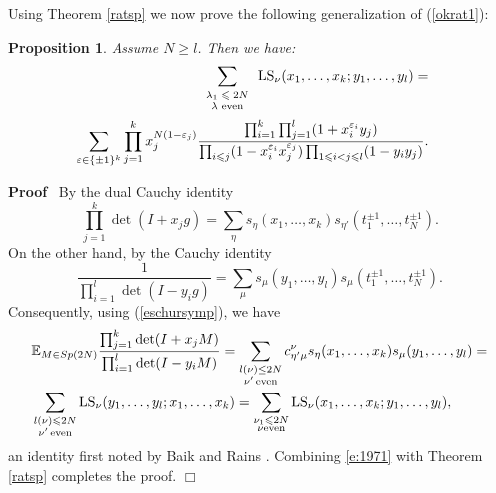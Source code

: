 \documentclass[11pt]{amsart}
\newcommand{\tmop}[1]{\ensuremath{\operatorname{#1}}}
\newtheorem{proposition}{Proposition}
\renewenvironment{proof}{
\noindent\textbf{Proof}\ }{\hspace*{\fill}
\begin{math}\Box\end{math}\medskip}
\newcommand{\tmscript}[1]{\text{\scriptsize $#1$}}
\newcommand{\HS}{{\hbox{\rm LS}}}
\begin{document}
Using Theorem \ref{ratsp} we now prove the following
generalization of (\ref{okrat1}):

\begin{proposition} Assume $N \geqslant l$. Then we
  have:
  \label{prop:ok1}
  \begin{eqnarray*}
    \sum_{\tmscript{\begin{array}{c}
      \lambda_1 \leqslant 2 N\\
      \text{$\lambda$ even}
    \end{array}}} \tmop{LS}_{\nu} ( x_1, \ldots, x_k ; y_1, \ldots, y_l ) = &
    & \\
    \sum_{\varepsilon \in \{ \pm 1 \}^k} \prod_{j = 1}^k x_j^{N ( 1 -
    \varepsilon_j )} \frac{\prod_{i = 1}^k \prod_{j = 1}^l ( 1 +
    x_i^{\varepsilon_i} y_j )}{\prod_{i \leqslant j} ( 1 - x_i^{\varepsilon_i}
    x_j^{\varepsilon_j} ) \prod_{1 \leqslant i < j \leqslant l} ( 1 - y_i y_j
    )} . &  &
  \end{eqnarray*}
\end{proposition}

\begin{proof}
  By the dual Cauchy identity
  \[ \prod_{j = 1}^k \det ( I + x_j g ) = \sum_{\eta} s_{\eta} ( x_1, \ldots,
     x_k ) s_{\eta'} ( t_1^{\pm 1}, \ldots, t_N^{\pm 1} ) . \]
  On the other hand, by the Cauchy identity
  \[ \frac{1}{\prod_{i = 1}^l \det ( I - y_i g )} = \sum_{\mu} s_{\mu} ( y_1,
     \ldots, y_l ) s_{\mu} ( t_1^{\pm 1}, \ldots, t_N^{\pm 1} ) . \]
  Consequently, using (\ref{eschursymp}), we have
\begin{equation}\label{e:1971}
\begin{aligned}
& {\mathbb E}_{M \in Sp(2N)} \frac{\prod_{j=1}^k \det (I+ x_j
M)}{\prod_{i=1}^l \det (I-y_i M)} = \sum_{\substack{l(\nu) \le
2N\\\nu' \, \text{even}}}c^{\nu}_{\eta' \mu} s_{\eta}(x_1,
\ldots, x_k) s_{\mu}(y_1, \ldots, y_l) =\\
&\sum_{\substack{l(\nu) \leqslant 2N\\\nu' \,
\text{even}}}\HS_{\nu}(y_1, \ldots, y_l; x_1, \ldots,
x_k)=\sum_{\substack{\nu_1 \leqslant 2N\\\nu \text{even}}}
\HS_{\nu}(x_1, \ldots, x_k; y_1, \ldots, y_l),
\end{aligned}
\end{equation}
an identity first noted by Baik and Rains  \cite{BR02}. Combining
\eqref{e:1971} with Theorem \ref{ratsp} completes the proof.
\end{proof}
\end{document}
